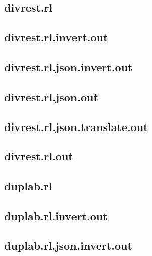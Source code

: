 \subsection{divrest.rl}
\label{app:divrest_rl}

\subsection{divrest.rl.invert.out}
\label{app:divrest_rl.invert.out}

\subsection{divrest.rl.json.invert.out}
\label{app:divrest_rl.json.invert.out}

\subsection{divrest.rl.json.out}
\label{app:divrest_rl.json.out}

\subsection{divrest.rl.json.translate.out}
\label{app:divrest_rl.json.translate.out}

\subsection{divrest.rl.out}
\label{app:divrest_rl.out}

\subsection{duplab.rl}
\label{app:duplab_rl}

\subsection{duplab.rl.invert.out}
\label{app:duplab_rl.invert.out}

\subsection{duplab.rl.json.invert.out}
\label{app:duplab_rl.json.invert.out}

